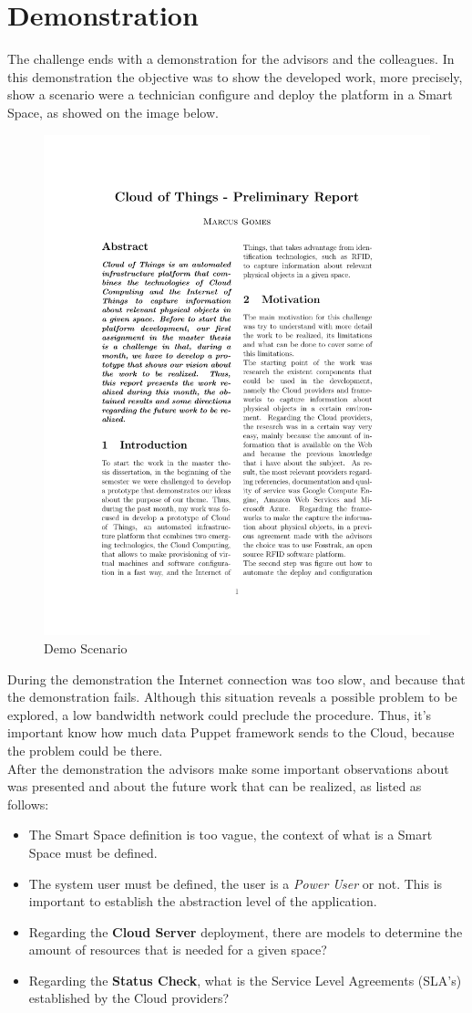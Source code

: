 \documentclass[12pt, twocolumn]{article}
\begin{document}
 \section{Demonstration}
 The challenge ends with a demonstration for the advisors and the colleagues. In this demonstration the objective was to show the developed work, more precisely, show a scenario were a technician configure and deploy the platform in a Smart Space, as showed on the image below.
 
 \begin{figure}[htb!]
    \centering
    \includegraphics[width=.45\textwidth]{cot}
    \caption{Demo Scenario}
    \label{fig:demo}
 \end{figure}
 
 During the demonstration the Internet connection was too slow, and because that the demonstration fails. Although this situation reveals a possible problem to be explored, a low bandwidth network could preclude the procedure. Thus, it's important know how
 much data Puppet framework sends to the Cloud, because the problem could be there.\\
 After the demonstration the advisors make some important observations about was presented and about the future work that can be realized, as listed as follows:
 \begin{itemize}
 \item
 The Smart Space definition is too vague, the context of what is a Smart Space must be defined.
 \item
 The system user must be defined, the user is a \textit{Power User} or not. This is important to establish the abstraction level of the application.
 \item
 Regarding the \textbf{Cloud Server} deployment, there are models to determine the amount of resources that is needed for a given space?
 \item
 Regarding the \textbf{Status Check}, what is the Service Level Agreements (SLA's) established by the Cloud providers?     
 \end{itemize}   
\end{document}
